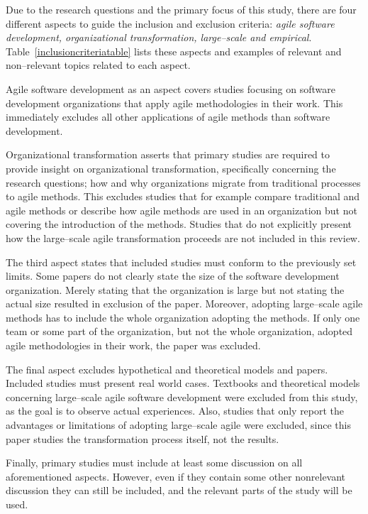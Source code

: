 Due to the research questions and the primary focus of this study, there are
four different aspects to guide the inclusion and exclusion criteria:
\textit{agile software development, organizational transformation, large–scale
and empirical}. Table~\ref{inclusioncriteriatable} lists these aspects and examples of relevant and
non–relevant topics related to each aspect.

\pagebreak
{

}
\bigskip

Agile software development as an aspect covers studies focusing on
software development organizations that apply agile methodologies in
their work. This immediately excludes all other applications of agile
methods than software development.

Organizational transformation asserts that primary studies are required
to provide insight on organizational transformation, specifically
concerning the research questions; how and why organizations
migrate from traditional processes to agile methods. This excludes
studies that for example compare traditional and agile methods or describe
how agile methods are used in an organization but not covering the
introduction of the methods. Studies that do not explicitly present how
the large–scale agile transformation proceeds are not included in this
review.

The third aspect states that included studies must conform to the
previously set limits. Some papers do not clearly state the size of the
software development organization. Merely stating that the organization
is large but not stating the actual size resulted in exclusion of the
paper. Moreover, adopting large–scale agile methods has to include the
whole organization adopting the methods. If only one team or some part
of the organization, but not the whole organization, adopted agile
methodologies in their work, the paper was excluded.

The final aspect excludes hypothetical and theoretical models and
papers. Included studies must present real world cases. Textbooks
and theoretical models concerning large–scale agile software
development were excluded from this study, as the goal is to observe
actual experiences. Also, studies that only report the advantages or
limitations of adopting large–scale agile were excluded, since this
paper studies the transformation process itself, not the results.

Finally, primary studies must include at least some discussion on
all aforementioned aspects. However, even if they contain some other
nonrelevant discussion they can still be included, and the relevant
parts of the study will be used.
